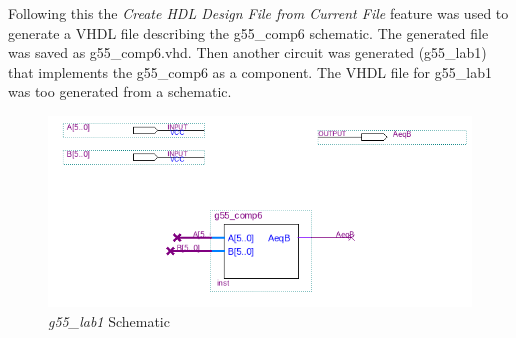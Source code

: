 \documentclass[12pt]{article}
\begin{document}
Following this the \textit{Create HDL Design File from Current File} feature was used to generate a VHDL file describing the g55\_comp6 schematic. The generated file was saved as g55\_comp6.vhd. Then another circuit was generated (g55\_lab1) that implements the g55\_comp6 as a component. The VHDL file for g55\_lab1 was too generated from a schematic.
\begin{figure}[h!t]
	\includegraphics[scale=0.5]{graphics/lab1_schematic.png}
	\caption{\textit{g55\_lab1} Schematic}
\end{figure}
\end{document}
